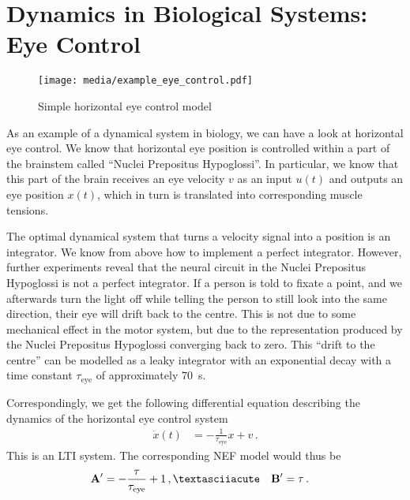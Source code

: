 \documentclass[10pt,letterpaper,oneside]{article}
\begin{document}
\section{Dynamics in Biological Systems: Eye Control}

\begin{figure}
	\centering
	\texttt{[image: media/example\_eye\_control.pdf]}
	\caption{Simple horizontal eye control model}
\end{figure}

As an example of a dynamical system in biology, we can have a look at horizontal eye control. We know that horizontal eye position is controlled within a part of the brainstem called \enquote{Nuclei Prepositus Hypoglossi}. In particular, we know that this part of the brain receives an eye velocity $v$ as an input $u(t)$ and outputs an eye position $x(t)$, which in turn is translated into corresponding muscle tensions.

The optimal dynamical system that turns a velocity signal into a position is an integrator. We know from above how to implement a perfect integrator. However, further experiments reveal that the neural circuit in the Nuclei Prepositus Hypoglossi is not a perfect integrator. If a person is told to fixate a point, and we afterwards turn the light off while telling the person to still look into the same direction, their eye will drift back to the centre. This is not due to some mechanical effect in the motor system, but due to the representation produced by the Nuclei Prepositus Hypoglossi converging back to zero. This \enquote{drift to the centre} can be modelled as a leaky integrator with an exponential decay with a time constant $\tau_\mathrm{eye}$ of approximately \SI{70}{\second}.

Correspondingly, we get the following differential equation describing the dynamics of the horizontal eye control system
\begin{align*}
	\dot x(t) &= - \frac{1}{\tau_\mathrm{eye}} x + v \,.
\end{align*}
This is an LTI system. The corresponding NEF model would thus be
\begin{align*}
	\mat A' &=  - \frac{\tau}{\tau_\mathrm{eye}} + 1 \,,´&
	\mat B' &= \tau \,.
\end{align*}

\printbibliography
\end{document}
